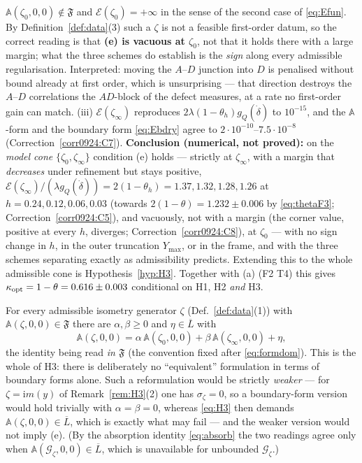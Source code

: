 \documentclass[11pt]{article}
\newcommand{\Aop}{\mathbb A}
\begin{document}
\begin{remark}
$\Aop(\zeta_0,0,0)\notin\mathfrak F$ and $\mathcal E(\zeta_0)=+\infty$ in the sense of the
second case of \eqref{eq:Efun}.  By Definition~\ref{def:data}(3) such a $\zeta$ is not a
feasible first-order datum, so the correct reading is that \textbf{(e) is vacuous at
$\zeta_0$}, not that it holds there with a large margin; what the three schemes do
establish is the \emph{sign} along every admissible regularisation.  Interpreted: moving
the $A$--$D$ junction into $D$ is penalised without bound already at first order, which is
unsurprising --- that direction destroys the $A$--$D$ correlations the $AD$-block of the
defect measures, at a rate no first-order gain can match.  (iii) $\mathcal E(\zeta_\infty)$ reproduces $2\lambda(1-\theta_h)g_Q(\dot\delta)$
to $10^{-15}$, and the $\Aop$-form and the boundary form \eqref{eq:Ebdry} agree to
$2\cdot10^{-10}$--$7.5\cdot10^{-8}$ (Correction~\ref{corr0924:C7}).  \textbf{Conclusion (numerical, not proved):} on the
\emph{model cone} $\{\zeta_0,\zeta_\infty\}$ condition (e) holds --- strictly at $\zeta_\infty$, with a
margin that \emph{decreases} under refinement but stays positive, $\mathcal E(\zeta_\infty)/(\lambda g_Q(\dot\delta))=2(1-\theta_h)=1.37,1.32,1.28,1.26$ at $h=0.24,0.12,0.06,0.03$ (towards $2(1-\theta)=1.232\pm0.006$ by \eqref{eq:thetaF3}; Correction~\ref{corr0924:C5}), and vacuously, not with a margin (the corner value, positive at every $h$, diverges; Correction~\ref{corr0924:C8}),
at $\zeta_0$ --- with no sign change in $h$, in the outer truncation $Y_{\max}$, or in the
frame, and with the three schemes separating exactly as admissibility predicts.  Extending
this to the whole admissible cone is Hypothesis~\ref{hyp:H3}.  Together with (a) (F2 T4)
this gives $\kappa_{\rm opt}=1-\theta=0.616\pm0.003$ conditional on H1, H2 \emph{and} H3.
\end{remark}


\begin{definition}\label{hyp:H3}
For every admissible isometry generator $\zeta$ (Def.~\ref{def:data}(1)) with
$\Aop(\zeta,0,0)\in\mathfrak F$ there are $\alpha,\beta\ge0$ and $\eta\in\overline L$ with
\begin{equation}\label{eq:H3}
 \Aop(\zeta,0,0)=\alpha\,\Aop(\zeta_0,0,0)+\beta\,\Aop(\zeta_\infty,0,0)+\eta ,
\end{equation}
the identity being read \emph{in $\mathfrak F$} (the convention fixed after
\eqref{eq:formdom}).  This is the whole of H3: there is deliberately no ``equivalent''
formulation in terms of boundary forms alone.  Such a reformulation would be strictly
\emph{weaker} --- for $\zeta=\mathrm im(y)$ of Remark~\ref{rem:H3}(2) one has
$\sigma_\zeta=0$, so a boundary-form version would hold trivially with $\alpha=\beta=0$,
whereas \eqref{eq:H3} then demands $\Aop(\zeta,0,0)\in\overline L$, which is exactly what
may fail --- and the weaker version would not imply (e).  (By the absorption identity
\eqref{eq:absorb} the two readings agree only when
$\Aop(\mathcal G_\zeta,0,0)\in\overline L$, which is unavailable for unbounded
$\mathcal G_\zeta$.)
\end{definition}
\end{document}
